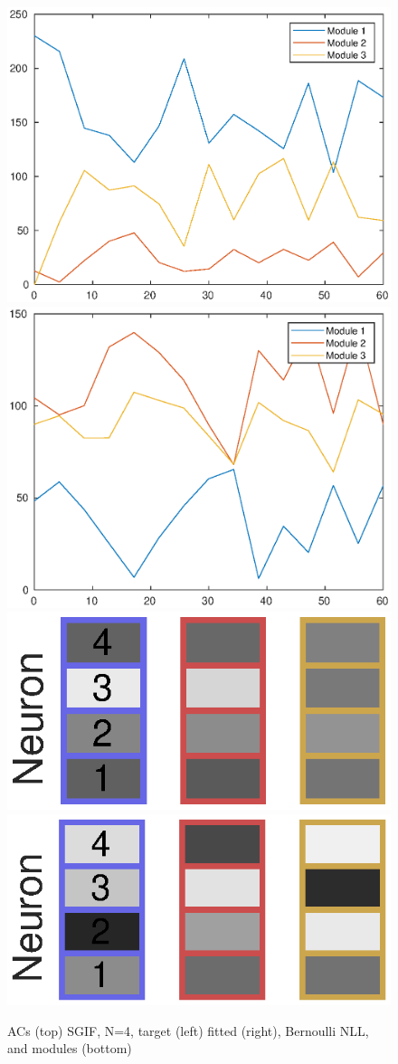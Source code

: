 \documentclass[mphil,deptreport,ianc]{infthesis} %
\begin{document}
\begin{figure}
    \includegraphics[width=0.49\columnwidth]{figures/matlab/NMF/ACs_target_GT_model_mesoGIF_N_4.eps}
    \includegraphics[width=0.49\columnwidth]{figures/matlab/NMF/ACs_nuovo_spikes_mt_microGIF_euid_12-09_16-02-03-400_lfn_bernoulli_nll.eps}
    \centering
    \includegraphics[width=0.3\columnwidth]{figures/matlab/NMF/target_GT_model_mesoGIF_N_4.eps}
    \includegraphics[width=0.3\columnwidth]{figures/matlab/NMF/modules_nuovo_spikes_mt_microGIF_euid_12-09_16-02-03-400_lfn_bernoulli_nll_4.eps}
    \caption{ACs (top) SGIF, N=4, target (left) fitted (right), Bernoulli NLL, and modules (bottom)}
\end{figure}
\end{document}
